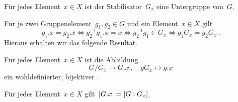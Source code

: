 \begin{proposition}
  Für jedes Element~$x \in X$ ist der Stabilisator~$G_x$ eine Untergruppe von~$G$.
\end{proposition}


%

Für je zwei Gruppenelement~$g_1, g_2 \in G$ und ein Element~$x \in X$ gilt
\[
  g_1.x = g_2.x
  \iff
  g_2^{-1} g_1.x = x
  \iff
  g_2^{-1} g_1 \in G_x
  \iff
  g_1 G_x = g_2 G_x \,.
\]
Hieraus erhalten wir das folgende Resultat.

\begin{corollary}
  \label{isomorphism theorem for G-sets}
  Für jedes Element~$x \in X$ ist die Abbildung
  \[
    G/G_x \to G.x \,,
    \quad
    g G_x \mapsto g.x
  \]
  ein wohldefinierter, bijektiver~.
\end{corollary}

\begin{corollary}
  Für jedes Element~$x \in X$ gilt~$\lvert G.x\rvert = [G : G_x]$.
\end{corollary}

